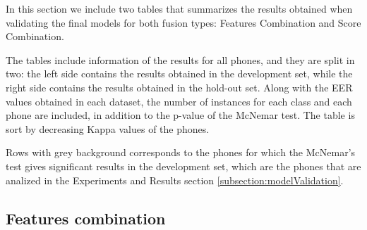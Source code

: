 In this section we include two tables that summarizes the results obtained when validating
the final models for both fusion types: Features Combination and Score Combination.

The tables include information of the results
for all phones, and they are split in two: the left side
contains the results obtained in the development set, while the right side contains
the results obtained in the hold-out set. Along with the EER values obtained in each
dataset,
the number of instances
for each class and each phone are included, in addition to the p-value of the McNemar
test. The table is sort by decreasing Kappa values of the phones.

Rows with grey background corresponds to the phones for which
the McNemar's test gives significant results in the development set, which are the
phones that are analized in the Experiments and Results section \ref{subsection:modelValidation}.

\subsection{Features combination}


